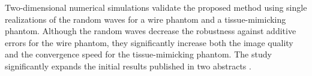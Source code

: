 Two-dimensional numerical simulations validate
the proposed method using
single realizations of
the random waves for
a wire phantom and
a tissue-mimicking phantom.
Although
the random waves decrease
the robustness against
additive errors for
the wire phantom,
they significantly increase both
the image quality and
the convergence speed for
the tissue-mimicking phantom.
The study significantly expands
the initial results published in
two abstracts
\cite{proc:SchiffnerIUS2017,article:SchiffnerJASA2017}.

